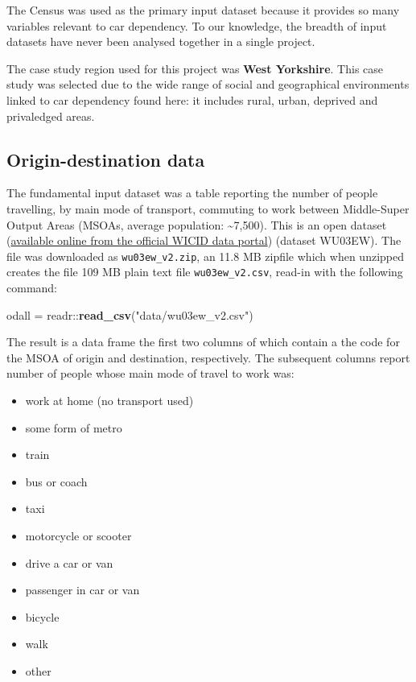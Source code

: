 \documentclass[]{article}
\newenvironment{Shaded}{\begin{snugshade}}{\end{snugshade}}
\newcommand{\KeywordTok}[1]{\textcolor[rgb]{0.13,0.29,0.53}{\textbf{{#1}}}}
\newcommand{\StringTok}[1]{\textcolor[rgb]{0.31,0.60,0.02}{{#1}}}
\newcommand{\NormalTok}[1]{{#1}}
\providecommand{\tightlist}{%
  \setlength{\itemsep}{0pt}\setlength{\parskip}{0pt}}
\begin{document}
The Census was used as the primary input dataset because it provides so
many variables relevant to car dependency. To our knowledge, the breadth
of input datasets have never been analysed together in a single project.

The case study region used for this project was \textbf{West Yorkshire}.
This case study was selected due to the wide range of social and
geographical environments linked to car dependency found here: it
includes rural, urban, deprived and privaledged areas.

\subsection{Origin-destination data}\label{origin-destination-data}

The fundamental input dataset was a table reporting the number of people
travelling, by main mode of transport, commuting to work between
Middle-Super Output Areas (MSOAs, average population:
\textasciitilde{}7,500). This is an open dataset
(\href{http://wicid.ukdataservice.ac.uk/}{available online from the
official WICID data portal}) (dataset WU03EW). The file was downloaded
as \texttt{wu03ew\_v2.zip}, an 11.8 MB zipfile which when unzipped
creates the file 109 MB plain text file \texttt{wu03ew\_v2.csv}, read-in
with the following command:

\begin{Shaded}
\begin{Highlighting}[]
\NormalTok{odall =}\StringTok{ }\NormalTok{readr::}\KeywordTok{read_csv}\NormalTok{(}\StringTok{"data/wu03ew_v2.csv"}\NormalTok{)}
\end{Highlighting}
\end{Shaded}

The result is a data frame the first two columns of which contain a the
code for the MSOA of origin and destination, respectively. The
subsequent columns report number of people whose main mode of travel to
work was:

\begin{itemize}
\tightlist
\item
  work at home (no transport used)
\item
  some form of metro
\item
  train
\item
  bus or coach
\item
  taxi
\item
  motorcycle or scooter
\item
  drive a car or van
\item
  passenger in car or van
\item
  bicycle
\item
  walk
\item
  other
\end{itemize}
\end{document}
